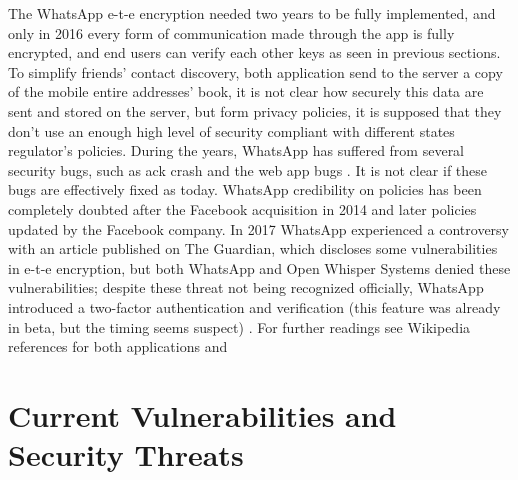 \documentclass{article}
\begin{document}
The WhatsApp e-t-e encryption needed two years to be fully implemented, and only in 2016 every form of communication made through the app is fully encrypted, and end users can verify each other keys as seen in previous sections.\newline
To simplify friends' contact discovery, both application send to the server a copy of the mobile entire addresses' book, it is not clear how securely this data are sent and stored on the server, but form privacy policies, it is supposed that they don't use an enough high level of security compliant with different states regulator's policies.\newline 
During the years, WhatsApp has suffered from several security bugs, such as ack crash \cite{ack_crash} and the web app bugs \cite{what_web}. It is not clear if these bugs are effectively fixed as today.\newline
WhatsApp credibility on policies has been completely doubted after the Facebook acquisition in 2014 and later policies updated by the Facebook company.\newline
In 2017 WhatsApp experienced a controversy with an article published on The Guardian, which discloses some vulnerabilities in e-t-e encryption, but both WhatsApp and Open Whisper Systems denied these vulnerabilities; despite these threat not being recognized officially, WhatsApp introduced a two-factor authentication and verification (this feature was already in beta, but the timing seems suspect) \cite{what_threat}.\newline
For further readings see Wikipedia references for both applications \cite{tel_wiki} and \cite{what_wiki}


\section{Current Vulnerabilities and Security Threats}
\end{document}
